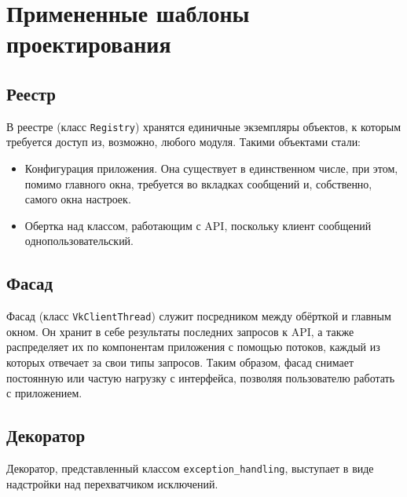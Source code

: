 \documentclass[12pt]{article}
\begin{document}
\newpage
\section{Примененные шаблоны проектирования}
\subsection{Реестр}
В реестре (класс {\tt Registry}) хранятся единичные экземпляры объектов, к которым требуется доступ из, возможно, любого модуля. Такими объектами стали:
\begin{itemize}
\setlength{\itemsep}{-1mm} %
\item Конфигурация приложения. Она существует в единственном числе, при этом, помимо главного окна, требуется во вкладках сообщений и, собственно, самого окна настроек.
\item Обертка над классом, работающим с API, поскольку клиент сообщений однопользовательский.
\end{itemize}

\subsection{Фасад}
Фасад (класс {\tt VkClientThread}) служит посредником между обёрткой и главным окном. Он хранит в себе результаты последних запросов к API, а также распределяет их по компонентам приложения с помощью потоков, каждый из которых отвечает за свои типы запросов. Таким образом, фасад снимает постоянную или частую нагрузку с интерфейса, позволяя пользователю работать с приложением.

\subsection{Декоратор}
Декоратор, представленный классом {\tt exception\_handling}, выступает в виде надстройки над перехватчиком исключений. %
\end{document}
